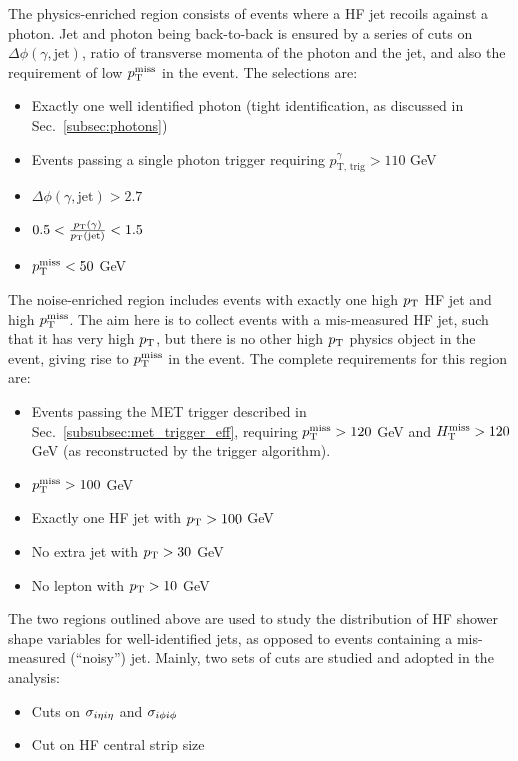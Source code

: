 The physics-enriched region consists of events where a HF jet recoils against a photon. 
Jet and photon being back-to-back is ensured by a series of cuts on $\Delta\phi(\gamma, \textrm{jet})$,
ratio of transverse momenta of the photon and the jet, and also the requirement of low $p_{\textrm{T}}^{\textrm{miss}}$ in the event. The selections are:

\begin{itemize}
    \item Exactly one well identified photon (tight identification, as discussed in Sec.~\ref{subsec:photons})
    \item Events passing a single photon trigger requiring $p_{\textrm{T, trig}}^{\gamma} > 110$ GeV
    \item $\Delta\phi(\gamma, \textrm{jet}) > 2.7$
    \item $0.5 < \frac{p_{\textrm{T}}(\gamma)}{{p_{\textrm{T}}}(\textrm{jet})} < 1.5$
    \item $p_{\textrm{T}}^{\textrm{miss}} < 50$ GeV
\end{itemize}

The noise-enriched region includes events with exactly one high $p_{\textrm{T}}$ HF jet and high $p_{\textrm{T}}^{\textrm{miss}}$.
The aim here is to collect events with a mis-measured HF jet, such that it has very high $p_{\textrm{T}}$, but there is no other high $p_{\textrm{T}}$ physics object in the event,
giving rise to $p_{\textrm{T}}^{\textrm{miss}}$ in the event.
The complete requirements for this region are:

\begin{itemize}
    \item Events passing the MET trigger described in Sec.~\ref{subsubsec:met_trigger_eff}, requiring $p_{\textrm{T}}^{\textrm{miss}} > 120$ GeV and $H_{\mathrm{T}}^{\mathrm{miss}} > 120$ GeV
    (as reconstructed by the trigger algorithm). 
    \item $p_{\textrm{T}}^{\textrm{miss}} > 100$ GeV
    \item Exactly one HF jet with $p_{\textrm{T}} > 100$ GeV
    \item No extra jet with $p_{\textrm{T}} > 30$ GeV
    \item No lepton with $p_{\textrm{T}} > 10$ GeV
\end{itemize}

The two regions outlined above are used to study the distribution of HF shower shape variables for well-identified jets, as opposed to events
containing a mis-measured (``noisy'') jet. Mainly, two sets of cuts are studied and adopted in the analysis:

\begin{itemize}
    \item Cuts on $\sigma_{i\eta i\eta}$ and $\sigma_{i\phi i\phi}$
    \item Cut on HF central strip size
\end{itemize}

